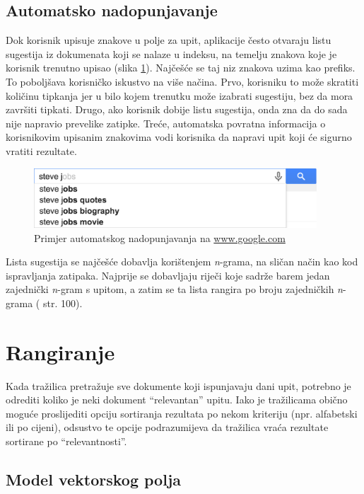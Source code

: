 \documentclass[a4paper,twoside,12pt]{scrreprt}
\begin{document}
\subsection{Automatsko nadopunjavanje}

Dok korisnik upisuje znakove u polje za upit, aplikacije često otvaraju listu sugestija iz dokumenata koji se nalaze u indeksu, na temelju znakova koje je korisnik trenutno upisao (slika \ref{typeahead}). Najčešće se taj niz znakova uzima kao prefiks. To poboljšava korisničko iskustvo na više načina. Prvo, korisniku to može skratiti količinu tipkanja jer u bilo kojem trenutku može izabrati sugestiju, bez da mora završiti tipkati. Drugo, ako korisnik dobije listu sugestija, onda zna da do sada nije napravio prevelike zatipke. Treće, automatska povratna informacija o korisnikovim upisanim znakovima vodi korisnika da napravi upit koji će sigurno vratiti rezultate.

\begin{figure}[H]
  \centering
  \includegraphics[width=300pt]{typeahead}
  \caption{Primjer automatskog nadopunjavanja na \url{www.google.com}}
  \label{typeahead}
\end{figure}

Lista sugestija se najčešće dobavlja korištenjem \textit{n}-grama, na sličan način kao kod ispravljanja zatipaka. Najprije se dobavljaju riječi koje sadrže barem jedan zajednički \textit{n}-gram s upitom, a zatim se ta lista rangira po broju zajedničkih \textit{n}-grama (\cite{taming} str. 100).

\section{Rangiranje}

Kada tražilica pretražuje sve dokumente koji ispunjavaju dani upit, potrebno je odrediti koliko je neki dokument ``relevantan'' upitu. Iako je tražilicama obično moguće proslijediti opciju sortiranja rezultata po nekom kriteriju (npr. alfabetski ili po cijeni), odsustvo te opcije podrazumijeva da tražilica vraća rezultate sortirane po ``relevantnosti''.

\subsection{Model vektorskog polja}
\end{document}
